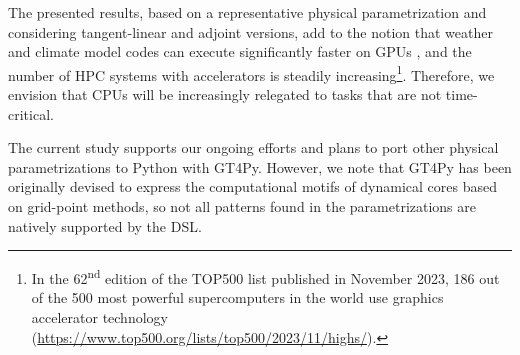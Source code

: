 \documentclass[main.tex]{subfiles}
\begin{document}
        The presented results, based on a representative physical parametrization and considering tangent-linear and adjoint versions, add to the notion that weather and climate model codes can execute significantly faster on GPUs \citep{fuhrer18}, and the number of HPC systems with accelerators is steadily increasing\footnote{In the 62\textsuperscript{nd} edition of the TOP500 list published in November 2023, 186 out of the 500 most powerful supercomputers in the world use graphics accelerator technology (\url{https://www.top500.org/lists/top500/2023/11/highs/}).}. Therefore, we envision that CPUs will be increasingly relegated to tasks that are not time-critical.


        The current study supports our ongoing efforts and plans to port other physical parametrizations to Python with GT4Py. However, we note that GT4Py has been originally devised to express the computational motifs of dynamical cores based on grid-point methods, so not all patterns found in the parametrizations are natively supported by the DSL. 


\end{document}
